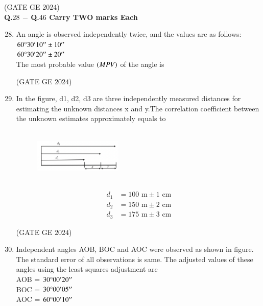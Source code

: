 \documentclass[journal,12pt,onecolumn]{IEEEtran}
\theoremstyle{remark}
\begin{document}
\hfill{(GATE GE $2024$)}
\bigskip
\\
\textbf{Q.$28$ $-$ Q.$46$ Carry TWO marks Each}\\
\begin{enumerate}
\setcounter{enumi}{27}
\item An angle is observed independently twice, and the values are as follows:\\
$60\degree30'10'' \pm 10''$\\
$60\degree30'20'' \pm 20''$\\
The most probable value $\left(MPV\right)$ of the angle is
\begin{enumerate}
\end{enumerate}
\hfill{(GATE GE $2024$)}
\bigskip
\item In the figure, d1, d2, d3 are three independently measured distances for estimating the unknown distances x and y.The correlation coefficient between the unknown estimates approximately equals to\\
\\

\begin{figure}[h!]
    \centering
    \includegraphics[width=0.4\textwidth]{figs/fig5.png}
\end{figure}\\

\begin{align*}
d_1 &= 100 \text{ m} \pm 1 \text{ cm} \\
d_2 &= 150 \text{ m} \pm 2 \text{ cm} \\
d_3 &= 175 \text{ m} \pm 3 \text{ cm}
\end{align*}

\begin{enumerate}
\end{enumerate}
\hfill{(GATE GE $2024$)}
\bigskip
\item Independent angles AOB, BOC and AOC were observed as shown in figure.
The standard error of all observations is same. The adjusted values of these angles using the least squares adjustment are\\
AOB = $30\degree00'20''$\\
BOC = $30\degree00'05''$\\
AOC = $60\degree00'10''$\\


\end{enumerate}
\end{document}
